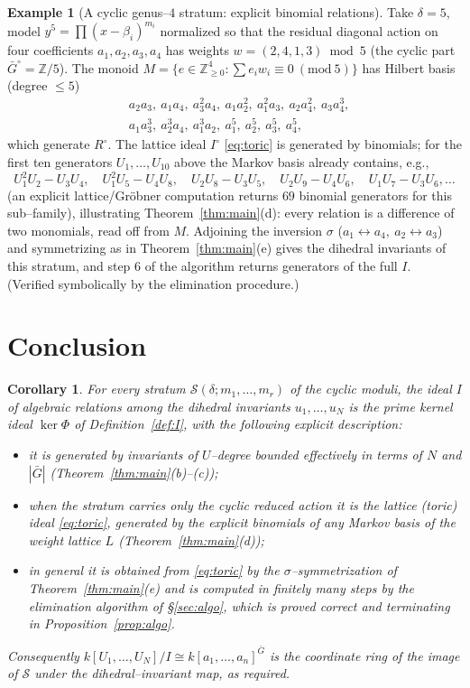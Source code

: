 \documentclass{amsart}
\newtheorem{corollary}[theorem]{Corollary}
\theoremstyle{definition}
\newtheorem{example}[theorem]{Example}
\begin{document}
\begin{example}[A cyclic genus--$4$ stratum: explicit binomial relations]\label{ex:cyclic}
Take $\delta=5$, model $y^5=\prod(x-\beta_i)^{m_i}$ normalized so that the residual
diagonal action on four coefficients $a_1,a_2,a_3,a_4$ has weights
$w=(2,4,1,3)\bmod 5$ (the cyclic part $\bar G^{\circ}=\mathbb{Z}/5$). The monoid
$M=\{e\in\mathbb{Z}_{\ge0}^4:\sum e_iw_i\equiv0\ (\mathrm{mod}\ 5)\}$ has Hilbert
basis (degree $\le 5$)
\[
\begin{aligned}
&a_2a_3,\ a_1a_4,\ a_3^2a_4,\ a_1a_2^2,\ a_1^2a_3,\ a_2a_4^2,\ a_3a_4^3,\\
&a_1a_3^3,\ a_2^3a_4,\ a_1^3a_2,\ a_1^5,\ a_2^5,\ a_3^5,\ a_4^5 ,
\end{aligned}
\]
which generate $R^{\circ}$. The lattice ideal $I^{\circ}$ \eqref{eq:toric} is
generated by binomials; for the first ten generators
$U_1,\dots,U_{10}$ above the Markov basis already contains, e.g.,
\[
 U_1^2U_2-U_3U_4,\quad U_1^2U_5-U_4U_8,\quad U_2U_8-U_3U_5,\quad U_2U_9-U_4U_6,\quad U_1U_7-U_3U_6,\dots
\]
(an explicit lattice/Gr\"obner computation returns $69$ binomial generators for this
sub--family), illustrating Theorem~\ref{thm:main}(d): every relation is a difference
of two monomials, read off from $M$. Adjoining the inversion $\sigma$
($a_1\!\leftrightarrow\!a_4,\ a_2\!\leftrightarrow\!a_3$) and symmetrizing as in
Theorem~\ref{thm:main}(e) gives the dihedral invariants of this stratum, and step 6
of the algorithm returns generators of the full $I$. (Verified symbolically by the
elimination procedure.)
\end{example}

\section{Conclusion}

\begin{corollary}\label{cor:answer}
For every stratum $\mathcal S(\delta;m_1,\dots,m_r)$ of the cyclic moduli, the ideal
$I$ of algebraic relations among the dihedral invariants $u_1,\dots,u_N$ is the prime
kernel ideal $\ker\Phi$ of Definition~\ref{def:I}, with the following explicit
description:
\begin{itemize}
\item it is generated by invariants of $U$--degree bounded effectively in terms of
$N$ and $|\bar G|$ (Theorem~\ref{thm:main}(b)--(c));
\item when the stratum carries only the cyclic reduced action it is the lattice
(toric) ideal \eqref{eq:toric}, generated by the explicit binomials of any Markov
basis of the weight lattice $L$ (Theorem~\ref{thm:main}(d));
\item in general it is obtained from \eqref{eq:toric} by the $\sigma$--symmetrization
of Theorem~\ref{thm:main}(e) and is computed in finitely many steps by the
elimination algorithm of \S\ref{sec:algo}, which is proved correct and terminating
in Proposition~\ref{prop:algo}.
\end{itemize}
Consequently $k[U_1,\dots,U_N]/I\cong k[a_1,\dots,a_n]^{\bar G}$ is the coordinate
ring of the image of $\mathcal S$ under the dihedral--invariant map, as required.
\end{corollary}
\end{document}

